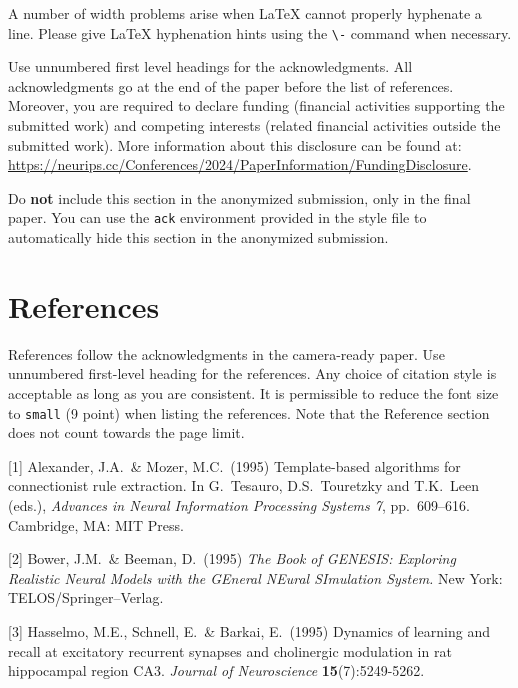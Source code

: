 \documentclass{article}
\begin{document}
A number of width problems arise when \LaTeX{} cannot properly hyphenate a
line. Please give LaTeX hyphenation hints using the \verb+\-+ command when
necessary.

\begin{ack}
Use unnumbered first level headings for the acknowledgments. All acknowledgments
go at the end of the paper before the list of references. Moreover, you are required to declare
funding (financial activities supporting the submitted work) and competing interests (related financial activities outside the submitted work).
More information about this disclosure can be found at: \url{https://neurips.cc/Conferences/2024/PaperInformation/FundingDisclosure}.


Do {\bf not} include this section in the anonymized submission, only in the final paper. You can use the \texttt{ack} environment provided in the style file to automatically hide this section in the anonymized submission.
\end{ack}

\section*{References}


References follow the acknowledgments in the camera-ready paper. Use unnumbered first-level heading for
the references. Any choice of citation style is acceptable as long as you are
consistent. It is permissible to reduce the font size to \verb+small+ (9 point)
when listing the references.
Note that the Reference section does not count towards the page limit.
\medskip


{
\small


[1] Alexander, J.A.\ \& Mozer, M.C.\ (1995) Template-based algorithms for
connectionist rule extraction. In G.\ Tesauro, D.S.\ Touretzky and T.K.\ Leen
(eds.), {\it Advances in Neural Information Processing Systems 7},
pp.\ 609--616. Cambridge, MA: MIT Press.


[2] Bower, J.M.\ \& Beeman, D.\ (1995) {\it The Book of GENESIS: Exploring
  Realistic Neural Models with the GEneral NEural SImulation System.}  New York:
TELOS/Springer--Verlag.


[3] Hasselmo, M.E., Schnell, E.\ \& Barkai, E.\ (1995) Dynamics of learning and
recall at excitatory recurrent synapses and cholinergic modulation in rat
hippocampal region CA3. {\it Journal of Neuroscience} {\bf 15}(7):5249-5262.
}


\end{document}
